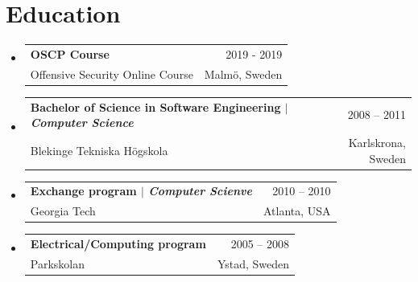 \documentclass[A4,11pt]{article}
\makeatletter
\newcommand{\CVSubheading}[4]{
  \vspace{-2pt}\item
    \begin{tabular*}{0.97\textwidth}[t]{l@{\extracolsep{\fill}}r}
      \textbf{#1} & #2 \\
      \small#3 & \small #4 \\
    \end{tabular*}\vspace{-7pt}
}
\newcommand{\CVSubHeadingListStart}{\begin{itemize}[leftmargin=0.5cm, label={}]}
\newcommand{\CVSubHeadingListEnd}{\end{itemize}}
\makeatother
\begin{document}

\section{Education}
  \CVSubHeadingListStart
    \CVSubheading
      {{OSCP Course}}{2019 - 2019}
      {Offensive Security Online Course}{Malmö, Sweden}
    \CVSubheading
      {{Bachelor of Science in Software Engineering $|$ \emph{\small{Computer Science}}}}{2008 -- 2011}
      {Blekinge Tekniska Högskola}{Karlskrona, Sweden}
    \CVSubheading
      {{Exchange program $|$ \emph{\small{Computer Scienve}}}}{2010 -- 2010}
      {Georgia Tech}{Atlanta, USA}
    \CVSubheading
      {Electrical/Computing program}{2005 -- 2008}
      {Parkskolan}{Ystad, Sweden}
  \CVSubHeadingListEnd

\end{document}
